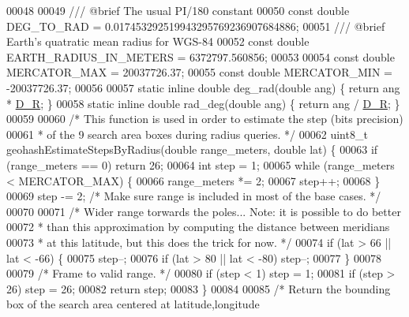 \begin{DoxyCode}
00048 
00049 \textcolor{comment}{/// @brief The usual PI/180 constant}
00050 \textcolor{keyword}{const} \textcolor{keywordtype}{double} DEG\_TO\_RAD = 0.017453292519943295769236907684886;
00051 \textcolor{comment}{/// @brief Earth's quatratic mean radius for WGS-84}
00052 \textcolor{keyword}{const} \textcolor{keywordtype}{double} EARTH\_RADIUS\_IN\_METERS = 6372797.560856;
00053 
00054 \textcolor{keyword}{const} \textcolor{keywordtype}{double} MERCATOR\_MAX = 20037726.37;
00055 \textcolor{keyword}{const} \textcolor{keywordtype}{double} MERCATOR\_MIN = -20037726.37;
00056 
00057 \textcolor{keyword}{static} \textcolor{keyword}{inline} \textcolor{keywordtype}{double} deg\_rad(\textcolor{keywordtype}{double} ang) \{ \textcolor{keywordflow}{return} ang * \hyperlink{geohash__helper_8c_a96d3ed094cee215a1c3806455ecfc4d2}{D\_R}; \}
00058 \textcolor{keyword}{static} \textcolor{keyword}{inline} \textcolor{keywordtype}{double} rad\_deg(\textcolor{keywordtype}{double} ang) \{ \textcolor{keywordflow}{return} ang / \hyperlink{geohash__helper_8c_a96d3ed094cee215a1c3806455ecfc4d2}{D\_R}; \}
00059 
00060 \textcolor{comment}{/* This function is used in order to estimate the step (bits precision)}
00061 \textcolor{comment}{ * of the 9 search area boxes during radius queries. */}
00062 uint8\_t geohashEstimateStepsByRadius(\textcolor{keywordtype}{double} range\_meters, \textcolor{keywordtype}{double} lat) \{
00063     \textcolor{keywordflow}{if} (range\_meters == 0) \textcolor{keywordflow}{return} 26;
00064     \textcolor{keywordtype}{int} step = 1;
00065     \textcolor{keywordflow}{while} (range\_meters < MERCATOR\_MAX) \{
00066         range\_meters *= 2;
00067         step++;
00068     \}
00069     step -= 2; \textcolor{comment}{/* Make sure range is included in most of the base cases. */}
00070 
00071     \textcolor{comment}{/* Wider range torwards the poles... Note: it is possible to do better}
00072 \textcolor{comment}{     * than this approximation by computing the distance between meridians}
00073 \textcolor{comment}{     * at this latitude, but this does the trick for now. */}
00074     \textcolor{keywordflow}{if} (lat > 66 || lat < -66) \{
00075         step--;
00076         \textcolor{keywordflow}{if} (lat > 80 || lat < -80) step--;
00077     \}
00078 
00079     \textcolor{comment}{/* Frame to valid range. */}
00080     \textcolor{keywordflow}{if} (step < 1) step = 1;
00081     \textcolor{keywordflow}{if} (step > 26) step = 26;
00082     \textcolor{keywordflow}{return} step;
00083 \}
00084 
00085 \textcolor{comment}{/* Return the bounding box of the search area centered at latitude,longitude}

\end{DoxyCode}
